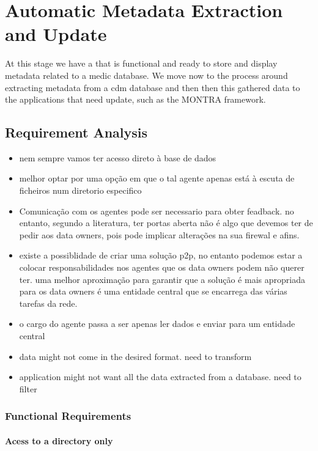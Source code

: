 \chapter{Automatic Metadata Extraction and Update}
\label{chapter:metadata-visualization}
\graphicspath{{figs/04-extraction-update/}}

At this stage we have a that is functional and ready to store and display metadata related to a medic database.
We move now to the process around extracting metadata from a \gls{cdm} database and then then this gathered data to the applications that need update, such as the MONTRA framework.

\section{Requirement Analysis}

\begin{itemize}
    \item nem sempre vamos ter acesso direto à base de dados
        \item melhor optar por uma opção em que o tal agente apenas está à escuta de ficheiros num diretorio especifico
    \item Comunicação com os agentes pode ser necessario para obter feadback. no entanto, segundo a literatura, ter portas aberta não é algo que devemos ter de pedir aos data owners, pois pode implicar alterações na sua firewal e afins.
    \item existe a possiblidade de criar uma solução p2p, no entanto podemos estar a colocar responsabilidades nos agentes que os data owners podem não querer ter. uma melhor aproximação para garantir que a solução é mais apropriada para os data owners é uma entidade central que se encarrega das várias tarefas da rede.
    \item o cargo do agente passa a ser apenas ler dados e enviar para um entidade central
    \item data might not come in the desired format. need to transform
    \item application might not want all the data extracted from a database. need to filter
\end{itemize}

\subsection{Functional Requirements}

\subsubsection*{Acess to a directory only}


